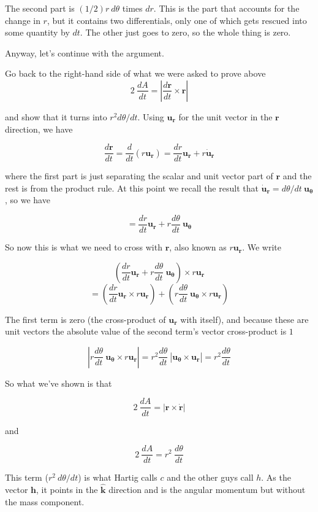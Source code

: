 \documentclass[11pt, oneside]{article}   	%
\begin{document}
The second part is $(1/2) r \ d\theta$ times $dr$.  This is the part that accounts for the change in $r$, but it contains two differentials, only one of which gets rescued into some quantity by $dt$.  The other just goes to zero, so the whole thing is zero. 

Anyway, let's continue with the argument.

Go back to the right-hand side of what we were asked to prove above
\[ 2 \ \frac{dA}{dt} =  | \frac{d\mathbf{r}}{dt} \times \mathbf{r} | \]

and show that it turns into $r^2 d\theta/dt$.  Using $\mathbf{u_r}$ for the unit vector in the $\mathbf{r}$ direction, we have

\[ \frac{d\mathbf{r}}{dt}  = \frac{d}{dt} (r \mathbf{u_r}) = \frac{dr}{dt} \mathbf{u_r} + r \dot{\mathbf{u}}_\mathbf{r} \]

where the first part is just separating the scalar and unit vector part of $\mathbf{r}$ and the rest is from the product rule.  At this point we recall the result that $\dot{\mathbf{u}}_\mathbf{r}  = d \theta/dt \ \mathbf{u_\theta}$, so we have

\[ = \frac{dr}{dt} \mathbf{u_r} + r  \frac{d \theta}{dt} \ \mathbf{u_\theta} \]

So now this is what we need to cross with $\mathbf{r}$, also known as $r \mathbf{u_r}$.  We write

\[ (\frac{dr}{dt}  \mathbf{u_r} + r  \frac{d \theta}{dt} \  \mathbf{u_\theta}) \times r  \mathbf{u_r} \]
\[ = (\frac{dr}{dt}  \mathbf{u_r} \times  r  \mathbf{u_r}) + (r  \frac{d \theta}{dt} \  \mathbf{u_\theta} \times r  \mathbf{u_r}) \]

The first term is zero (the cross-product of $\mathbf{u_r}$ with itself), and because these are unit vectors the absolute value of the second term's vector cross-product is $1$

\[ | r  \frac{d \theta}{dt} \ \mathbf{u_\theta} \times r \mathbf{u_r} | =  r^2 \frac{d \theta}{dt} \ |  \mathbf{u_\theta} \times  \mathbf{u_r} | =  r^2 \frac{d \theta}{dt} \]

So what we've shown is that 

\[ 2 \ \frac{dA}{dt} =  | \mathbf{r} \times \dot{\mathbf{r}} | \]

and

\[ 2 \ \frac{dA}{dt} =  r^2 \ \frac{d \theta}{dt} \]

This term ($r^2 \ d\theta/dt$) is what Hartig calls $c$ and the other guys call $h$.  As the vector $\mathbf{h}$, it points in the $\hat{\mathbf{k}}$ direction and is the angular momentum but without the mass component.
\end{document}
